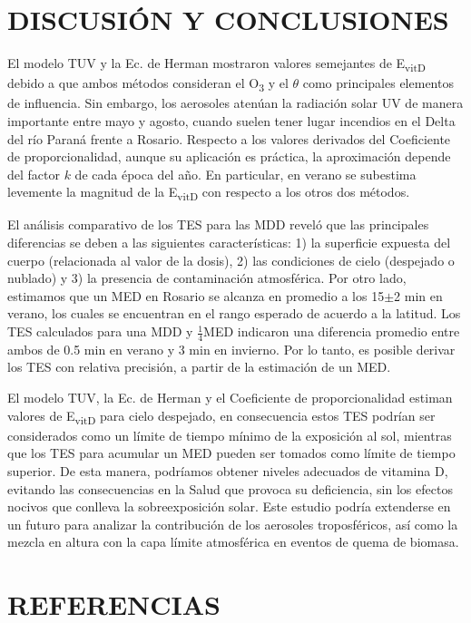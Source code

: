 \documentclass[10pt,twocolumn]{article}
\begin{document}
\section{DISCUSIÓN Y CONCLUSIONES}
El modelo TUV y la Ec. de Herman mostraron valores semejantes de E\textsubscript{vitD} debido a que ambos métodos consideran el O\textsubscript{3} y el $\theta$ como principales elementos de influencia. Sin embargo, los aerosoles atenúan la radiación solar UV de manera importante entre mayo y agosto, cuando suelen tener lugar incendios en el Delta del río Paraná frente a Rosario.\cite{IPINA2012966} Respecto a los valores derivados del Coeficiente de proporcionalidad, aunque su aplicación es práctica, la aproximación depende del factor $k$ de cada época del año. En particular, en verano se subestima levemente la magnitud de la E\textsubscript{vitD} con respecto a los otros dos métodos.

El análisis comparativo de los TES para las MDD reveló que las principales diferencias se deben a las siguientes características: 1) la superficie expuesta del cuerpo (relacionada al valor de la dosis), 2) las condiciones de cielo (despejado o nublado) y 3) la presencia de contaminación atmosférica. Por otro lado, estimamos que un MED en Rosario se alcanza en promedio a los 15$\pm$2 min en verano, los cuales se encuentran en el rango esperado de acuerdo a la latitud. Los TES calculados para una MDD y $\frac{1}{4}$MED indicaron una diferencia promedio entre ambos de 0.5 min en verano y 3 min en invierno. Por lo tanto, es posible derivar los TES con relativa precisión, a partir de la estimación de un MED.

El modelo TUV, la Ec. de Herman y el Coeficiente de proporcionalidad estiman valores de E\textsubscript{vitD} para cielo despejado, en consecuencia estos TES podrían ser considerados como un límite de tiempo mínimo de la exposición al sol, mientras que los TES para acumular un MED pueden ser tomados como límite de tiempo superior. De esta manera, podríamos obtener niveles adecuados de vitamina D, evitando las consecuencias en la Salud que provoca su deficiencia, sin los efectos nocivos que conlleva la sobreexposición solar. Este estudio podría extenderse en un futuro para analizar la contribución de los aerosoles troposféricos, así como la mezcla en altura con la capa límite atmosférica en eventos de quema de biomasa.
\section{REFERENCIAS}
\renewcommand{\refname}{}

\end{document}
